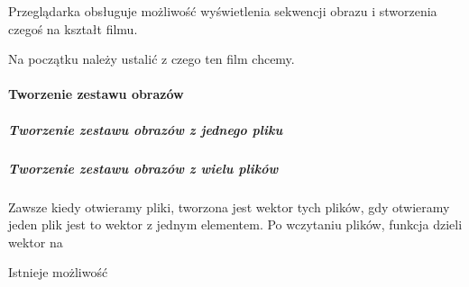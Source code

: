 \label{sec:scene-sets}

Przeglądarka obsługuje możliwość wyświetlenia sekwencji obrazu i stworzenia czegoś na kształt filmu.

Na początku należy ustalić z czego ten film chcemy.

\paragraph{Tworzenie zestawu obrazów}

\subparagraph{Tworzenie zestawu obrazów z jednego pliku}

\subparagraph{Tworzenie zestawu obrazów z wielu plików}

Zawsze kiedy otwieramy pliki, tworzona jest wektor tych plików, gdy otwieramy jeden plik jest to wektor z jednym elementem.
Po wczytaniu plików, funkcja  dzieli wektor na 

Istnieje możliwość 